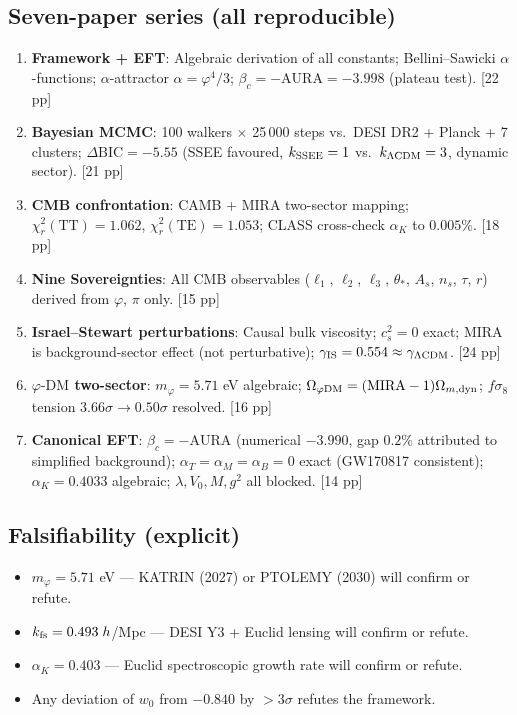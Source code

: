 \documentclass[11pt,a4paper]{article}
\newcommand{\phiDM}{\varphi\text{-DM}}
\begin{document}
\subsection*{Seven-paper series (all reproducible)}

\begin{enumerate}
  \item \textbf{Framework + EFT}: Algebraic derivation of all constants;
        Bellini--Sawicki $\alpha$-functions; $\alpha$-attractor
        $\alpha=\varphi^4/3$; $\beta_c=-\text{AURA}=-3.998$ (plateau test). [22 pp]
  \item \textbf{Bayesian MCMC}: 100 walkers $\times$ 25\,000 steps vs.\ DESI DR2
        + Planck + 7 clusters; $\Delta\text{BIC}=-5.55$ (SSEE favoured,
        $k_{\rm SSEE}=1$ vs.\ $k_{\Lambda\rm CDM}=3$, dynamic sector). [21 pp]
  \item \textbf{CMB confrontation}: CAMB + MIRA two-sector mapping;
        $\chi^2_r(\text{TT})=1.062$, $\chi^2_r(\text{TE})=1.053$;
        CLASS cross-check $\alpha_K$ to $0.005\%$. [18 pp]
  \item \textbf{Nine Sovereignties}: All CMB observables ($\ell_1$, $\ell_2$, $\ell_3$,
        $\theta_*$, $A_s$, $n_s$, $\tau$, $r$) derived from $\varphi$, $\pi$ only. [15 pp]
  \item \textbf{Israel--Stewart perturbations}: Causal bulk viscosity;
        $c_s^2=0$ exact; MIRA is background-sector effect
        (not perturbative); $\gamma_{\rm IS}=0.554\approx\gamma_{\Lambda\rm CDM}$. [24 pp]
  \item \textbf{$\phiDM$ two-sector}: $m_\varphi=5.71$ eV algebraic;
        $\Omega_{\varphi\rm DM}=({\rm MIRA}-1)\Omega_{m,\rm dyn}$;
        $f\sigma_8$ tension $3.66\sigma\to0.50\sigma$ resolved. [16 pp]
  \item \textbf{Canonical EFT}: $\beta_c=-\text{AURA}$ (numerical $-3.990$, gap $0.2\%$
        attributed to simplified background); $\alpha_T=\alpha_M=\alpha_B=0$ exact
        (GW170817 consistent); $\alpha_K=0.4033$ algebraic; $\lambda,V_0,M,g^2$ all
        blocked. [14 pp]
\end{enumerate}

\subsection*{Falsifiability (explicit)}

\begin{itemize}
  \item $m_\varphi=5.71$ eV — KATRIN (2027) or PTOLEMY (2030) will confirm or refute.
  \item $k_{\rm fs}=0.493\;h$/Mpc — DESI Y3 + Euclid lensing will confirm or refute.
  \item $\alpha_K=0.403$ — Euclid spectroscopic growth rate will confirm or refute.
  \item Any deviation of $w_0$ from $-0.840$ by $>3\sigma$ refutes the framework.
\end{itemize}
\end{document}
